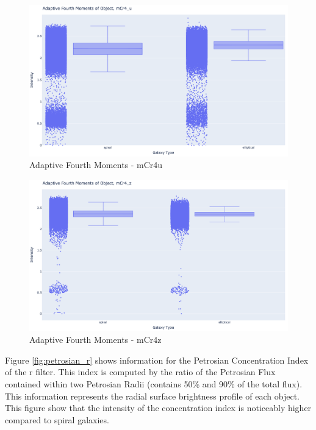 \documentclass[11pt,sigconf]{acmart}
\begin{document}
\begin{figure}[htbp]
  \centering
  \includegraphics[scale=0.15]{mcr4_u_stat}
  \caption{Adaptive Fourth Moments - mCr4u}
  \label{fig:mcr4_u_stat}
\end{figure}

\begin{figure}[htbp]
  \centering
  \includegraphics[scale=0.15]{mcr4_z_stat}
  \caption{Adaptive Fourth Moments - mCr4z}
  \label{fig:mcr4_z_stat}
\end{figure}

Figure \ref{fig:petrosian_r} shows information for the Petrosian Concentration 
Index of the r filter. This index is computed by the ratio of the Petrosian Flux 
contained within two Petrosian Radii (contains 50\% and 90\% of the total flux). 
This information represents the radial surface brightness profile of each object. 
This figure show that the intensity of the concentration index is noticeably higher 
compared to spiral galaxies. 
\end{document}

